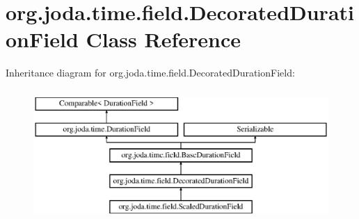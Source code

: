 \hypertarget{classorg_1_1joda_1_1time_1_1field_1_1_decorated_duration_field}{\section{org.\-joda.\-time.\-field.\-Decorated\-Duration\-Field Class Reference}
\label{classorg_1_1joda_1_1time_1_1field_1_1_decorated_duration_field}
}
Inheritance diagram for org.\-joda.\-time.\-field.\-Decorated\-Duration\-Field\-:\begin{figure}[H]
\begin{center}
\leavevmode
\includegraphics[height=5.000000cm]{classorg_1_1joda_1_1time_1_1field_1_1_decorated_duration_field}
\end{center}
\end{figure}
